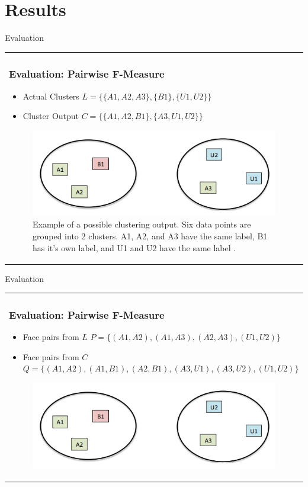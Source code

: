 \documentclass[11pt]{beamer}
\begin{document}
\section{Results}
\begin{frame}{Evaluation}
\begin{tabular}{l}
\parbox{1\linewidth}{
\frametitle{Evaluation: Pairwise F-Measure}
\begin{itemize}
\item Actual Clusters $L = \{\{A1, A2, A3\}, \{B1\}, \{U1, U2\}\}$
\item Cluster Output $C = \{\{A1, A2, B1\}, \{A3, U1, U2 \}\}$
\end{itemize}

\begin{figure}[!tbp]
 \centering
    \includegraphics[width=0.8\columnwidth]{figures/fmeasure.png}
    \caption{Example of a possible clustering output. Six data points are grouped into 2 clusters. A1, A2, and A3 have the same label, B1 has it's own label, and U1 and U2 have the same label \cite{otto}.}
    \label{fig:fmeasure}
\end{figure}
}
\end{tabular}  
\end{frame}

\begin{frame}{Evaluation}
\begin{tabular}{l}
\parbox{1\linewidth}{
\frametitle{Evaluation: Pairwise F-Measure}
\begin{itemize}
\item Face pairs from $L$ $P = \{(A1, A2), (A1, A3), (A2, A3), (U1, U2)\}$
\item Face pairs from $C$ \\$Q = \{(A1, A2), (A1, B1), (A2, B1), (A3, U1), (A3, U2), (U1, U2)\}$
\end{itemize}

\begin{figure}[!tbp]
 \centering
    \includegraphics[width=0.8\columnwidth]{figures/fmeasure.png}
    \label{fig:fmeasure}
\end{figure}
}
\end{tabular}  
\end{frame}
\end{document}

